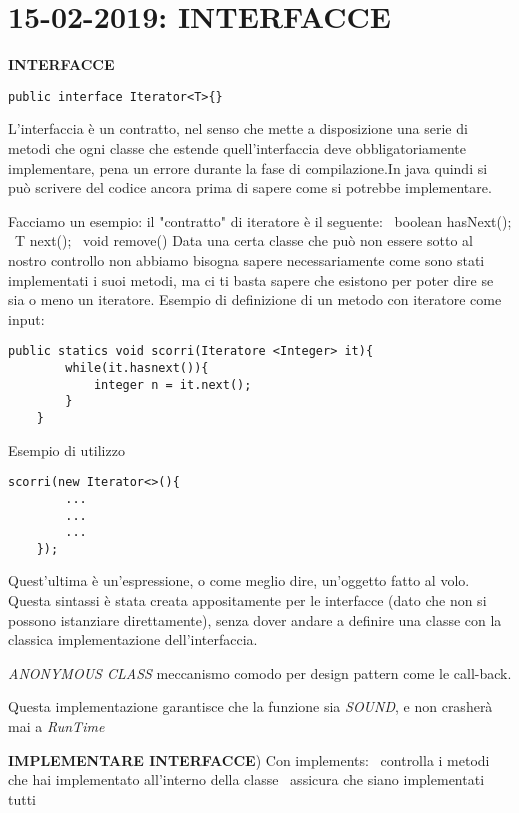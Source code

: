 
 
\newpage
\section{15-02-2019: INTERFACCE}
\textbf{INTERFACCE}
\begin{lstlisting}[basicstyle=\small,]
	public interface Iterator<T>{}
\end{lstlisting}
L'interfaccia è un contratto, nel senso che mette a disposizione una serie di metodi che ogni classe che estende quell'interfaccia deve obbligatoriamente implementare, pena un errore durante la fase di compilazione.In java quindi si può scrivere del codice ancora prima di sapere come si potrebbe implementare.

\noindent Facciamo un esempio: il "contratto" di iteratore è il seguente: \newline
\textbullet\ boolean hasNext(); \newline
\textbullet\ T next(); \newline
\textbullet\ void remove()\newline
Data una certa classe che può non essere sotto al nostro controllo non abbiamo bisogna sapere necessariamente come sono stati implementati i suoi metodi, ma ci ti basta sapere che esistono per poter dire se sia o meno un iteratore. \newline
Esempio di definizione di un metodo con iteratore come input: 
\begin{lstlisting}[basicstyle=\small,]
	public statics void scorri(Iteratore <Integer> it){
		while(it.hasnext()){
			integer n = it.next();
		}
	}
\end{lstlisting}
Esempio di utilizzo 
\begin{lstlisting}[basicstyle=\small,]
	scorri(new Iterator<>(){
		...
		...
		...
	});
\end{lstlisting}
Quest'ultima è un'espressione, o come meglio dire, un'oggetto fatto al volo. Questa sintassi è stata creata appositamente per le interfacce (dato che non si possono istanziare direttamente), senza dover andare a definire una classe con la classica implementazione dell'interfaccia. 

\noindent \textit{ANONYMOUS CLASS} meccanismo comodo per design pattern come le call-back. 

\noindent Questa implementazione garantisce che la funzione sia \textit{SOUND}, e non crasherà mai a \textit{RunTime}

\noindent \textbf{IMPLEMENTARE INTERFACCE}) Con implements: \newline
\textbullet\ controlla i metodi che hai implementato all'interno della classe \newline
\textbullet\ assicura che siano implementati tutti 

